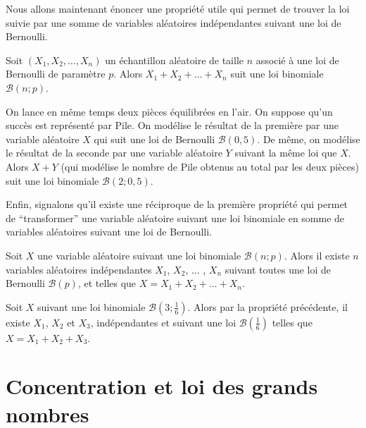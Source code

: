 	Nous allons maintenant énoncer une propriété utile qui permet de trouver la loi suivie par une somme de variables aléatoires indépendantes suivant une loi de Bernoulli.

	\begin{formula}
		Soit $(X_1, X_2, \dots, X_n)$ un échantillon aléatoire de taille $n$ associé à une loi de Bernoulli de paramètre $p$.
		\newpar
		Alors $X_1 + X_2 + \dots + X_n$ suit une loi binomiale $\mathcal{B}(n; p)$.
	\end{formula}

	\begin{tip}[Exemple]
		On lance en même temps deux pièces équilibrées en l'air. On suppose qu'un succès est représenté par Pile.
		\newpar
		On modélise le résultat de la première par une variable aléatoire $X$ qui suit une loi de Bernoulli $\mathcal{B}(0,5)$. De même, on modélise le résultat de la seconde par une variable aléatoire $Y$ suivant la même loi que $X$.
		\newpar
		Alors $X + Y$ (qui modélise le nombre de Pile obtenus au total par les deux pièces) suit une loi binomiale $\mathcal{B}(2; 0,5)$.
	\end{tip}

	Enfin, signalons qu'il existe une réciproque de la première propriété qui permet de ``transformer'' une variable aléatoire suivant une loi binomiale en somme de variables aléatoires suivant une loi de Bernoulli.

	\begin{formula}
		Soit $X$ une variable aléatoire suivant une loi binomiale $\mathcal{B}(n; p)$.
		\newpar
		Alors il existe $n$ variables aléatoires indépendantes $X_1$, $X_2$, ... , $X_n$ suivant toutes une loi de Bernoulli $\mathcal{B}(p)$, et telles que $X = X_1 + X_2 + \dots + X_n$.
	\end{formula}

	\begin{tip}[Exemple]
		Soit $X$ suivant une loi binomiale $\mathcal{B}\left(3; \frac{1}{6}\right)$. Alors par la propriété précédente, il existe $X_1$, $X_2$ et $X_3$, indépendantes et suivant une loi $\mathcal{B}\left(\frac{1}{6}\right)$ telles que $X = X_1 + X_2 + X_3$.
	\end{tip}

	\section{Concentration et loi des grands nombres}

